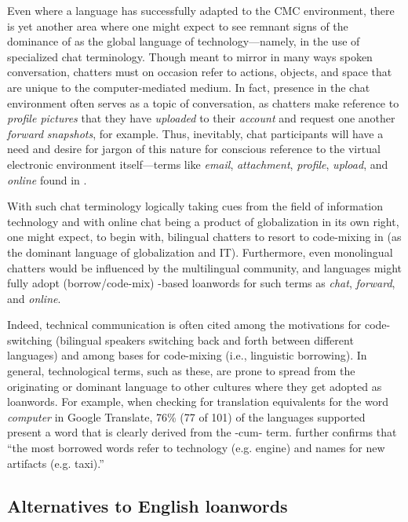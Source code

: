 \documentclass[output=paper
,newtxmath
,modfonts
,nonflat]{langsci/langscibook}
\begin{document}
Even where a language has successfully adapted to the CMC environment, there is yet another area where one might expect to see remnant signs of the dominance of  as the global language of technology—namely, in the use of specialized chat terminology. Though meant to mirror in many ways spoken conversation, chatters must on occasion refer to actions, objects, and space that are unique to the computer-mediated medium. In fact, presence in the chat environment often serves as a topic of conversation, as chatters make reference to \textit{profile pictures} that they have \textit{uploaded} to their \textit{account} and request one another \textit{forward} \textit{snapshots}, for example. Thus, inevitably, chat participants will have a need and desire for jargon of this nature for conscious reference to the virtual electronic environment itself—terms like \textit{email}, \textit{attachment}, \textit{profile}, \textit{upload}, and \textit{online} found in . 

With such chat terminology logically taking cues from the field of information technology and with online chat being a product of globalization in its own right, one might expect, to begin with, bilingual chatters to resort to code-mixing in  (as the dominant language of globalization and IT). Furthermore, even monolingual chatters would be influenced by the multilingual community, and languages might fully adopt (borrow/code-mix) -based loanwords for such terms as \textit{chat}, \textit{forward}, and \textit{online}.

Indeed, technical communication is often cited among the motivations for code-switching (bilingual speakers switching back and forth between different languages) and among bases for code-mixing (i.e., linguistic borrowing). In general, technological terms, such as these, are prone to spread from the originating or dominant language to other cultures where they get adopted as loanwords. For example, when checking for translation equivalents for the word \textit{computer} in Google Translate, 76\% (77 of 101) of the languages supported present a word that is clearly derived from the -cum- term. \citet{daulton2012} further confirms that “the most borrowed words refer to technology (e.g. engine) and names for new artifacts (e.g. taxi).”

\subsection{Alternatives to English loanwords}
\end{document}
